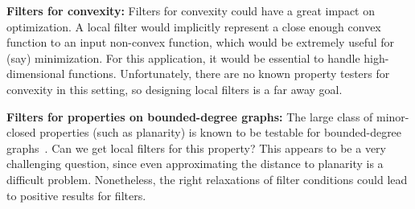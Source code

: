 \documentclass[natbib]{svcyclop}
\begin{document}
{\bf Filters for convexity:} Filters for convexity could have a great impact on optimization.
A local filter would implicitly represent a close enough convex function to an input non-convex function,
which would be extremely useful for (say) minimization. For this application, it would be essential
to handle high-dimensional functions. Unfortunately, there are no known property testers for convexity in this setting,
so designing local filters is a far away goal.

{\bf Filters for properties on bounded-degree graphs:} The large class of minor-closed properties (such as planarity)
is known to be testable for bounded-degree graphs~\cite{BSS08}. Can we get local filters for this property? This appears to 
be a very challenging question, since even approximating the distance to planarity is a difficult problem.
Nonetheless, the right relaxations of filter conditions could lead to positive results for filters.



%
%
%
%


%
%
%
%
%
%


\end{document}
